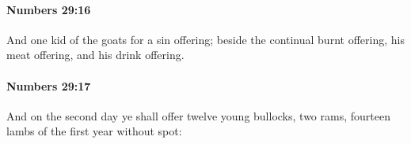 		\paragraph{Numbers 29:16} %
			\label{NUMBERS-29-16}

			And one kid of the goats for a sin offering; beside the continual burnt offering, his meat offering, and his drink offering.


		\paragraph{Numbers 29:17} %
			\label{NUMBERS-29-17}

			And on the second day ye shall offer twelve young bullocks, two rams, fourteen lambs of the first year without spot:


